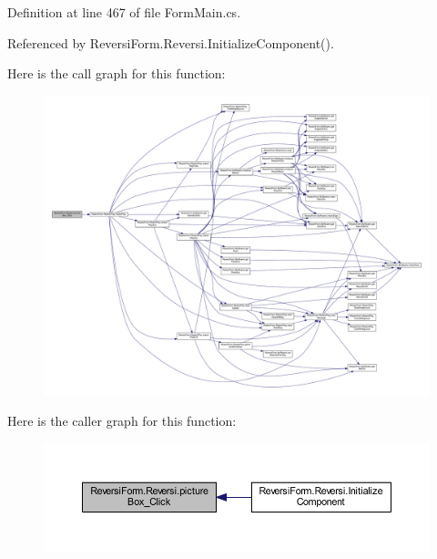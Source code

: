 Definition at line 467 of file Form\+Main.\+cs.



Referenced by Reversi\+Form.\+Reversi.\+Initialize\+Component().

Here is the call graph for this function\+:\nopagebreak
\begin{figure}[H]
\begin{center}
\leavevmode
\includegraphics[width=350pt]{class_reversi_form_1_1_reversi_afaa2a98428f4d9eab723fb71f8cb3e29_cgraph}
\end{center}
\end{figure}
Here is the caller graph for this function\+:\nopagebreak
\begin{figure}[H]
\begin{center}
\leavevmode
\includegraphics[width=350pt]{class_reversi_form_1_1_reversi_afaa2a98428f4d9eab723fb71f8cb3e29_icgraph}
\end{center}
\end{figure}
\mbox{\label{class_reversi_form_1_1_reversi_ac4868f12e6f15387f8f39f5f1934e610}} 

